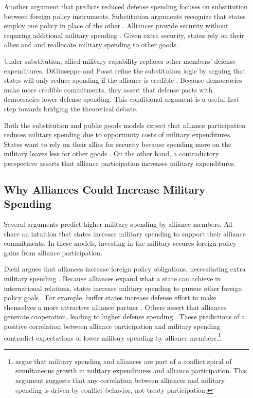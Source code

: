 \documentclass[12pt]{article}
\begin{document}
Another argument that predicts reduced defense spending focuses on substitution between foreign policy instruments.
Substitution arguments recognize that states employ one policy in place of the other \citep{MostStarr1989}.
Alliances provide security without requiring additional military spending \citep{Morrow1993, Conybeare1994}. 
Given extra security, states rely on their allies and and reallocate military spending to other goods. 


Under substitution, allied military capability replaces other members' defense expenditures. 
DiGiuseppe and Poast refine the substitution logic by arguing that states will only reduce spending if the alliance is credible \citep{DigiuseppePoast2016}.
Because democracies make more credible commitments, they assert that defense pacts with democracies lower defense spending.
This conditional argument is a useful first step towards bridging the theoretical debate. 


Both the substitution and public goods models expect that alliance participation reduces military spending due to opportunity costs of military expenditures. 
States want to rely on their allies for security because spending more on the military leaves less for other goods \citep{Fordham1998, Fearon2018}.
On the other hand, a contradictory perspective asserts that alliance participation increases military expenditures. 


\subsection{Why Alliances Could Increase Military Spending}


Several arguments predict higher military spending by alliance members.
All share an intuition that states increase military spending to support their alliance commitments. 
In these models, investing in the military secures foreign policy gains from alliance participation. 


Diehl argues that alliances increase foreign policy obligations, necessitating extra military spending \citep{Diehl1994}.
Because alliances expand what a state can achieve in international relations, states increase military spending to pursue other foreign policy goals \cite{MorganPalmer2006}.
For example, buffer states increase defense effort to make themselves a more attractive alliance partner \citep{Horowitzetal2017}.
Others assert that alliances generate cooperation, leading to higher defense spending \citep{Palmer1990, QuirozFlores2011}. 
These predictions of a positive correlation between alliance participation and military spending contradict expectations of lower military spending by alliance members.\footnote{
\citet{SeneseVasquez2008} argue that military spending and alliances are part of a conflict spiral of simultaneous growth in military expenditures and alliance participation. 
This argument suggests that any correlation between alliances and military spending is driven by conflict behavior, not treaty participation.
}
\end{document}
